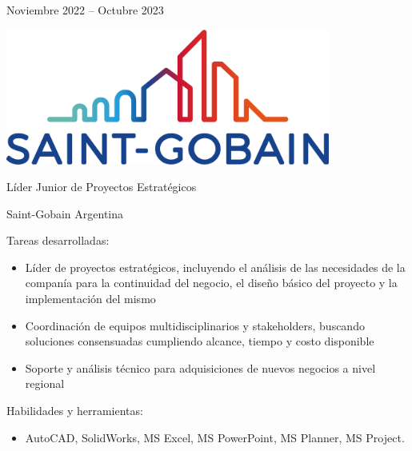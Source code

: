 \documentclass[a4paper,10pt]{article}
\newlength{\cvcolumngapwidth}
\newlength{\cvleftcolumnwidth}
\newlength{\cvrightcolumnwidth}
\newcommand{\cvtitlestyle}[1]{{\large\cvtitlefont\textcolor{cvtitlecolor}{#1}}}
\newcommand{\cvsubtitlestyle}[1]{{\cvtitlefont\textcolor{cvtitlecolor}{#1}}}
\newcommand{\cvdurationstyle}[1]{{\small\cvdurationfont\textcolor{cvdurationcolor}{#1}}}
\newlength{\cvafteritemskipamount}
\newlength{\cvaftertitleskipamount}
\newlength{\cvparskip}
\newcommand{\cvitem}[2]{
    \begin{minipage}[t]{\cvleftcolumnwidth}
        \raggedleft #1
    \end{minipage}%
    \hspace{\cvcolumngapwidth}%
    \begin{minipage}[t]{\cvrightcolumnwidth}
        \setlength{\parskip}{\cvparskip} #2
    \end{minipage}

    \vspace{\cvafteritemskipamount}
}
\newcommand{\cvtitle}[1]{
    \cvtitlestyle{#1}

    \vspace{\cvaftertitleskipamount}
    \vspace{-\cvparskip}
}
\begin{document}
\cvitem{
    \cvdurationstyle{Noviembre 2022 -- Octubre 2023}
}{
    \begin{minipage}{0.1\textwidth}
        \centering
        \includegraphics[width=0.8\textwidth]{../logos-photos/Logo_SG.png}   
    \end{minipage}
    \cvtitle{Líder Junior de Proyectos Estratégicos}

    \cvsubtitlestyle{Saint-Gobain Argentina}
	
	Tareas desarrolladas:
    \begin{itemize}
        \item Líder de proyectos estratégicos, incluyendo el análisis de las necesidades de la companía para la continuidad del negocio, el diseño básico del proyecto y la implementación del mismo
        \item Coordinación de equipos multidisciplinarios y stakeholders, buscando soluciones consensuadas cumpliendo alcance, tiempo y costo disponible
        \item Soporte y análisis técnico para adquisiciones de nuevos negocios a nivel regional
    \end{itemize}
	
	Habilidades y herramientas:
	\begin{itemize}
		\item AutoCAD, SolidWorks, MS Excel, MS PowerPoint, MS Planner, MS Project.
	\end{itemize}

}
\end{document}
